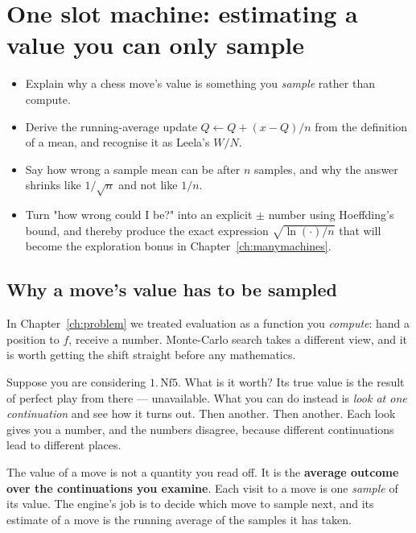 \chapter{One slot machine: estimating a value you can only sample}
\label{ch:onemachine}

\begin{objectives}
\begin{itemize}
\item Explain why a chess move's value is something you \emph{sample} rather than compute.
\item Derive the running-average update $Q \leftarrow Q + (x - Q)/n$ from the definition of
  a mean, and recognise it as Leela's $W/N$.
\item Say how wrong a sample mean can be after $n$ samples, and why the answer shrinks like
  $1/\sqrt{n}$ and not like $1/n$.
\item Turn "how wrong could I be?" into an explicit $\pm$ number using Hoeffding's bound,
  and thereby produce the exact expression $\sqrt{\ln(\cdot)/n}$ that will become the
  exploration bonus in Chapter~\ref{ch:manymachines}.
\end{itemize}
\end{objectives}

\section{Why a move's value has to be sampled}

In Chapter~\ref{ch:problem} we treated evaluation as a function you \emph{compute}: hand a
position to $f$, receive a number. Monte-Carlo search takes a different view, and it is
worth getting the shift straight before any mathematics.

Suppose you are considering $1.\,\text{Nf5}$. What is it worth? Its true value is the result
of perfect play from there --- unavailable. What you can do instead is \emph{look at one
continuation} and see how it turns out. Then another. Then another. Each look gives you a
number, and the numbers disagree, because different continuations lead to different places.

\begin{keyidea}
The value of a move is not a quantity you read off. It is the \textbf{average outcome over
the continuations you examine}. Each visit to a move is one \emph{sample} of its value. The
engine's job is to decide which move to sample next, and its estimate of a move is the
running average of the samples it has taken.
\end{keyidea}


